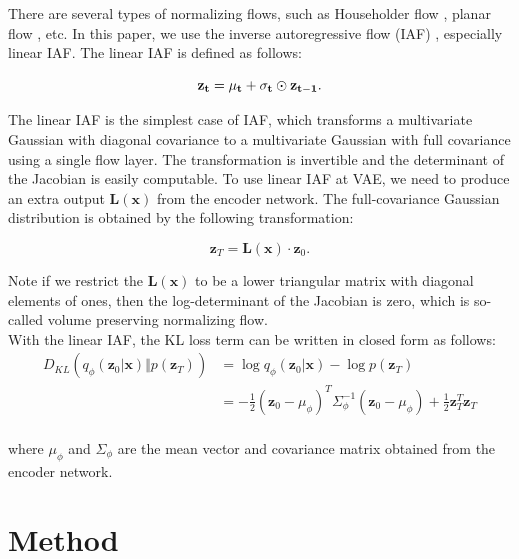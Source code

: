 \documentclass[10pt]{article}
\begin{document}
There are several types of normalizing flows, such as Householder flow \cite{tomczak2017householder}, planar flow \cite{rezende15normalizingflows}, etc. In this paper, we use the inverse autoregressive flow (IAF) \cite{kingma2016iaf}, especially linear IAF. The linear IAF is defined as follows:

\begin{equation}
    \bf z_t = \bf \mu_t + \bf \sigma_t \odot \bf z_{t-1}.
\end{equation}

The linear IAF is the simplest case of IAF, which transforms a multivariate Gaussian with diagonal covariance to a multivariate Gaussian with full covariance using a single flow layer. The transformation is invertible and the determinant of the Jacobian is easily computable. To use linear IAF at VAE, we need to produce an extra output $\mathbf{L(x)}$ from the encoder network. The full-covariance Gaussian distribution is obtained by the following transformation:

\begin{equation}
    \mathbf{z}_T = \mathbf{L(x)} \cdot \mathbf{z}_0.
\end{equation}

Note if we restrict the $\mathbf{L(x)}$ to be a lower triangular matrix with diagonal elements of ones, then the log-determinant of the Jacobian is zero, which is so-called volume preserving normalizing flow. \cite{kingma2016iaf}\\

With the linear IAF, the KL loss term can be written in closed form as follows:
\begin{equation}
    \begin{aligned}
        D_{KL}(q_\phi(\mathbf{z}_0 | \mathbf{x}) \Vert p(\mathbf{z}_T)) &=
        \log q_\phi(\mathbf{z}_0 | \mathbf{x}) - \log p(\mathbf{z}_T) \\
        &= -\frac{1}{2}(\mathbf{z}_0 -\mu_\phi)^T\Sigma_\phi^{-1}(\mathbf{z}_0 -\mu_\phi) + \frac{1}{2}\mathbf{z}_T^T\mathbf{z}_T \\
    \end{aligned}
\end{equation}

where $\mu_\phi$ and $\Sigma_\phi$ are the mean vector and covariance matrix obtained from the encoder network.\\

\section{Method}
\end{document}
